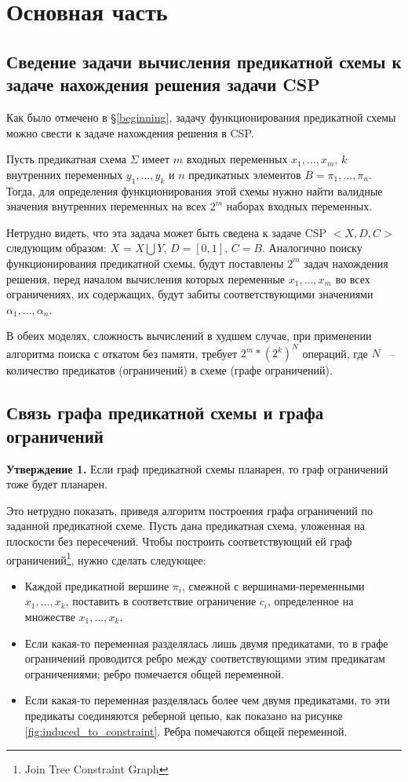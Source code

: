 \documentclass[12pt]{article}
\begin{document}
\section{Основная часть}
\subsection{Сведение задачи вычисления предикатной схемы к задаче нахождения решения задачи CSP}
Как было отмечено в \S \ref{beginning}, задачу функционирования предикатной схемы можно свести к задаче нахождения решения в CSP. 

Пусть предикатная схема $\Sigma$ имеет $m$ входных переменных $x_1, \ldots , x_m$, 
$k$ внутренних переменных $y_1, \ldots , y_k$ и $n$ предикатных элементов $B = \pi_1, \dots , \pi_n$. 
Тогда, для определения функционирования этой схемы нужно найти валидные значения внутренних переменных на всех $2^{m}$
наборах входных переменных. 

Нетрудно видеть, что эта задача может быть сведена к задаче CSP $<X, D, C>$ следующим образом:
$X$ = $X \bigcup Y$, $D = [0, 1]$, $C = B$. Аналогично поиску функционирования предикатной схемы, 
будут поставлены $2^m$ задач нахождения решения, перед началом вычисления которых переменные $x_1, \ldots , x_m$ 
во всех ограничениях, их содержащих, будут забиты соответствующими значениями $\alpha_1, \ldots , \alpha_n$.

В обеих моделях, сложность вычислений в худшем случае, при применении алгоритма поиска 
с откатом без памяти, требует $2^m * (2^k)^N$ операций, где $N$ ~-- количество предикатов (ограничений) 
в схеме (графе ограничений).

\subsection{Связь графа предикатной схемы и графа ограничений}

\textbf{Утверждение 1.} Если граф предикатной схемы планарен, то граф ограничений тоже будет планарен.

Это нетрудно показать, приведя алгоритм построения графа ограничений по заданной предикатной схеме. 
Пусть дана предикатная схема, уложенная на плоскости без пересечений. Чтобы построить соответствующий ей граф
ограничений\footnote{Join Tree Constraint Graph}, нужно сделать следующее:
\begin{itemize}
\item Каждой предикатной вершине $\pi_i$, смежной с вершинами-переменными $x_1, ... , x_k$, поставить в соответствие
ограничение $c_i$, определенное на множестве $x_1, ..., x_k$.
\item Если какая-то переменная разделялась лишь двумя предикатами, то в графе ограничений
проводится ребро между соответствующими этим предикатам ограничениями; ребро помечается общей переменной.
\item Если какая-то переменная разделялась более чем двумя предикатами, то эти предикаты соединяются 
реберной цепью, как показано на рисунке \ref{fig:induced_to_constraint}. Ребра помечаются общей переменной.
\end{itemize}
\end{document}
